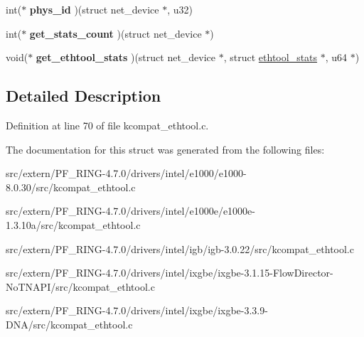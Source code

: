 \begin{DoxyCompactItemize}
\item 
\hypertarget{struct__kc__ethtool__ops_a8a6678b57c3fd554605aefe1ee9f7b20}{
int($\ast$ {\bfseries phys\_\-id} )(struct net\_\-device $\ast$, u32)}
\label{struct__kc__ethtool__ops_a8a6678b57c3fd554605aefe1ee9f7b20}

\item 
\hypertarget{struct__kc__ethtool__ops_a00f90653ff778e27d99373d1ccde5943}{
int($\ast$ {\bfseries get\_\-stats\_\-count} )(struct net\_\-device $\ast$)}
\label{struct__kc__ethtool__ops_a00f90653ff778e27d99373d1ccde5943}

\item 
\hypertarget{struct__kc__ethtool__ops_a369e3ba229dd0219207256a746ed2581}{
void($\ast$ {\bfseries get\_\-ethtool\_\-stats} )(struct net\_\-device $\ast$, struct \hyperlink{structethtool__stats}{ethtool\_\-stats} $\ast$, u64 $\ast$)}
\label{struct__kc__ethtool__ops_a369e3ba229dd0219207256a746ed2581}

\end{DoxyCompactItemize}


\subsection{Detailed Description}


Definition at line 70 of file kcompat\_\-ethtool.c.



The documentation for this struct was generated from the following files:\begin{DoxyCompactItemize}
\item 
src/extern/PF\_\-RING-\/4.7.0/drivers/intel/e1000/e1000-\/8.0.30/src/kcompat\_\-ethtool.c\item 
src/extern/PF\_\-RING-\/4.7.0/drivers/intel/e1000e/e1000e-\/1.3.10a/src/kcompat\_\-ethtool.c\item 
src/extern/PF\_\-RING-\/4.7.0/drivers/intel/igb/igb-\/3.0.22/src/kcompat\_\-ethtool.c\item 
src/extern/PF\_\-RING-\/4.7.0/drivers/intel/ixgbe/ixgbe-\/3.1.15-\/FlowDirector-\/NoTNAPI/src/kcompat\_\-ethtool.c\item 
src/extern/PF\_\-RING-\/4.7.0/drivers/intel/ixgbe/ixgbe-\/3.3.9-\/DNA/src/kcompat\_\-ethtool.c\end{DoxyCompactItemize}

